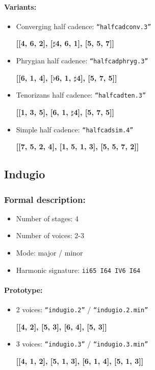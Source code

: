 \documentclass[11pt, openany]{article}
\begin{document}
\paragraph{Variants:}
\begin{itemize}
\item Converging half cadence: \texttt{“halfcadconv.3”}
	\begin{center}
	\textbf{[[4, 6, 2], [$\sharp$4, 6, 1], [5, 5, 7]]}
	\end{center}
\item Phrygian half cadence: \texttt{“halfcadphryg.3”}
	\begin{center}
	\textbf{[[6, 1, 4], [$\flat$6, 1, $\sharp$4], [5, 7, 5]]}
	\end{center}
\item Tenorizans half cadence: \texttt{“halfcadten.3”}
	\begin{center}
	\textbf{[[1, 3, 5], [6, 1, $\sharp$4], [5, 7, 5]]}
	\end{center}
\item Simple half cadence: \texttt{“halfcadsim.4”}
	\begin{center}
	\textbf{[[7, 5, 2, 4], [1, 5, 1, 3], [5, 5, 7, 2]]}
	\end{center}
\end{itemize}


	\subsection{Indugio}
	
\subsubsection{Formal description:}
\begin{itemize}
\item Number of stages: 4
\item Number of voices: 2-3
\item Mode: major / minor
\item Harmonic signature: \texttt{ii65 I64 IV6 I64}
\end{itemize}

\paragraph{Prototype:}
\begin{itemize}
\item 2 voices: \texttt{“indugio.2”} / \texttt{“indugio.2.min”}
	\begin{center}
	\textbf{[[4, 2], [5, 3], [6, 4], [5, 3]]}
	\end{center}
\item 3 voices: \texttt{“indugio.3”} / \texttt{“indugio.3.min”}
	\begin{center}
	\textbf{[[4, 1, 2], [5, 1, 3], [6, 1, 4], [5, 1, 3]]}
	\end{center}
\end{itemize}
\end{document}
